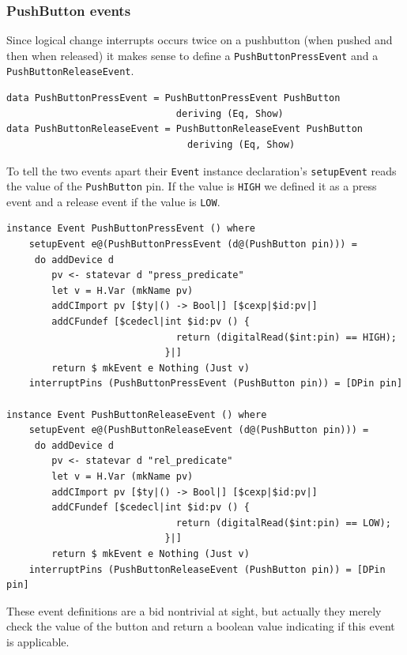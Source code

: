 \documentclass[a4paper, oneside, final]{memoir}
\begin{document}
\subsubsection{PushButton events}

Since logical change interrupts occurs twice on a pushbutton (when pushed and
then when released) it makes sense to define a \texttt{PushButtonPressEvent} and
a \texttt{PushButtonReleaseEvent}.

\begin{verbatim}
data PushButtonPressEvent = PushButtonPressEvent PushButton
                              deriving (Eq, Show)
data PushButtonReleaseEvent = PushButtonReleaseEvent PushButton
                                deriving (Eq, Show)
\end{verbatim}

To tell the two events apart their \texttt{Event} instance declaration's
\texttt{setupEvent} reads the value of the \texttt{PushButton} pin. If the value
is \texttt{HIGH} we defined it as a press event and a release event if the value
is \texttt{LOW}.

\begin{verbatim}
instance Event PushButtonPressEvent () where
    setupEvent e@(PushButtonPressEvent (d@(PushButton pin))) = 
     do addDevice d
        pv <- statevar d "press_predicate" 
        let v = H.Var (mkName pv)
        addCImport pv [$ty|() -> Bool|] [$cexp|$id:pv|]
        addCFundef [$cedecl|int $id:pv () {
                              return (digitalRead($int:pin) == HIGH);
                            }|]
        return $ mkEvent e Nothing (Just v)
    interruptPins (PushButtonPressEvent (PushButton pin)) = [DPin pin]

instance Event PushButtonReleaseEvent () where
    setupEvent e@(PushButtonReleaseEvent (d@(PushButton pin))) = 
     do addDevice d 
        pv <- statevar d "rel_predicate" 
        let v = H.Var (mkName pv)
        addCImport pv [$ty|() -> Bool|] [$cexp|$id:pv|]
        addCFundef [$cedecl|int $id:pv () {
                              return (digitalRead($int:pin) == LOW);
                            }|]
        return $ mkEvent e Nothing (Just v)
    interruptPins (PushButtonReleaseEvent (PushButton pin)) = [DPin pin]
\end{verbatim}

These event definitions are a bid nontrivial at sight, but actually they merely
check the value of the button and return a boolean value indicating if this
event is applicable. 
\end{document}
